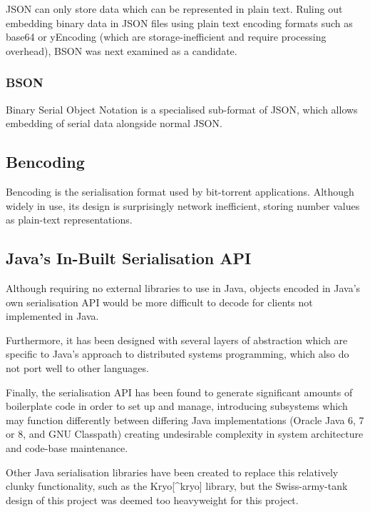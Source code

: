 \documentclass[12pt,a4paper,]{adreport}
\begin{document}
JSON can only store data which can be represented in plain text. Ruling
out embedding binary data in JSON files using plain text encoding
formats such as base64 or yEncoding (which are storage-inefficient and
require processing overhead), BSON was next examined as a candidate.

\subsubsection{BSON}\label{bson}

Binary Serial Object Notation is a specialised sub-format of JSON, which
allows embedding of serial data alongside normal JSON.

\subsection{Bencoding}\label{bencoding}

Bencoding is the serialisation format used by bit-torrent applications.
Although widely in use, its design is surprisingly network inefficient,
storing number values as plain-text representations.

\subsection{Java's In-Built Serialisation
API}\label{javas-in-built-serialisation-api}

Although requiring no external libraries to use in Java, objects encoded
in Java's own serialisation API would be more difficult to decode for
clients not implemented in Java.

Furthermore, it has been designed with several layers of abstraction
which are specific to Java's approach to distributed systems
programming, which also do not port well to other languages.

Finally, the serialisation API has been found to generate significant
amounts of boilerplate code in order to set up and manage, introducing
subsystems which may function differently between differing Java
implementations (Oracle Java 6, 7 or 8, and GNU Classpath) creating
undesirable complexity in system architecture and code-base maintenance.

Other Java serialisation libraries have been created to replace this
relatively clunky functionality, such as the Kryo{[}\^{}kryo{]} library,
but the Swiss-army-tank design of this project was deemed too
heavyweight for this project.
\end{document}

